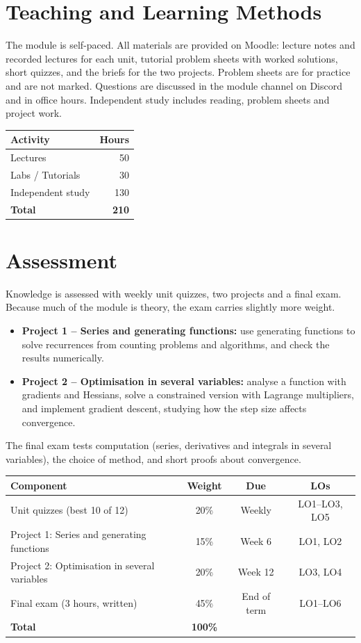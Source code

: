 \documentclass[11pt,a4paper]{article}
\begin{document}
\section{Teaching and Learning Methods}
The module is self-paced. All materials are provided on Moodle: lecture notes and
recorded lectures for each unit, tutorial problem sheets with worked solutions,
short quizzes, and the briefs for the two projects. Problem sheets are for practice
and are not marked. Questions are discussed in the module channel on Discord and in
office hours. Independent study includes reading, problem sheets and project work.

\begin{tabularx}{0.6\textwidth}{X r}
\toprule
\textbf{Activity} & \textbf{Hours} \\
\midrule
Lectures            & 50 \\
Labs / Tutorials    & 30 \\
Independent study   & 130 \\
\midrule
\textbf{Total}      & \textbf{210} \\
\bottomrule
\end{tabularx}

\section{Assessment}
Knowledge is assessed with weekly unit quizzes, two projects and a final
exam. Because much of the module is theory, the exam carries slightly more weight.
\begin{itemize}
  \item \textbf{Project 1 -- Series and generating functions:} use generating
        functions to solve recurrences from counting problems and algorithms, and
        check the results numerically.
  \item \textbf{Project 2 -- Optimisation in several variables:} analyse a function
        with gradients and Hessians, solve a constrained version with Lagrange
        multipliers, and implement gradient descent, studying how the step size
        affects convergence.
\end{itemize}
The final exam tests computation (series, derivatives and integrals in several
variables), the choice of method, and short proofs about convergence.

\begin{tabularx}{\textwidth}{X c c c}
\toprule
\textbf{Component} & \textbf{Weight} & \textbf{Due} & \textbf{LOs} \\
\midrule
Unit quizzes (best 10 of 12) & 20\% & Weekly & LO1--LO3, LO5 \\
Project 1: Series and generating functions & 15\% & Week 6 & LO1, LO2 \\
Project 2: Optimisation in several variables & 20\% & Week 12 & LO3, LO4 \\
Final exam (3 hours, written) & 45\% & End of term & LO1--LO6 \\
\midrule
\textbf{Total}      & \textbf{100\%} & & \\
\bottomrule
\end{tabularx}
\end{document}
